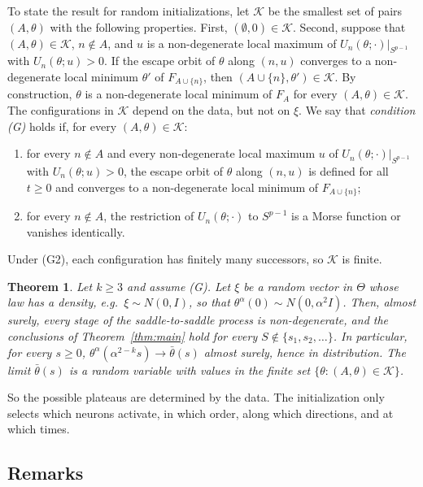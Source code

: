 \documentclass[11pt]{article}
\newtheorem{maintheorem}{Theorem}
\theoremstyle{definition}
\theoremstyle{remark}
\numberwithin{equation}{section}
\newcommand{\cK}{\mathcal{K}}
\begin{document}
To state the result for random initializations, let $\cK$ be the smallest set of pairs $(A,\theta)$ with the following properties. First, $(\emptyset,0)\in\cK$. Second, suppose that $(A,\theta)\in\cK$, $n\notin A$, and $u$ is a non-degenerate local maximum of $U_n(\theta;\cdot)|_{S^{p-1}}$ with $U_n(\theta;u)>0$. If the escape orbit of $\theta$ along $(n,u)$ converges to a non-degenerate local minimum $\theta'$ of $F_{A\cup\{n\}}$, then $(A\cup\{n\},\theta')\in\cK$. By construction, $\theta$ is a non-degenerate local minimum of $F_A$ for every $(A,\theta)\in\cK$. The configurations in $\cK$ depend on the data, but not on $\xi$. We say that \emph{condition \textup{(G)}} holds if, for every $(A,\theta)\in\cK$:
\begin{enumerate}[label=\textup{(G\arabic*)},leftmargin=4em]
\item for every $n\notin A$ and every non-degenerate local maximum $u$ of $U_n(\theta;\cdot)|_{S^{p-1}}$ with $U_n(\theta;u)>0$, the escape orbit of $\theta$ along $(n,u)$ is defined for all $t\ge0$ and converges to a non-degenerate local minimum of $F_{A\cup\{n\}}$;
\item for every $n\notin A$, the restriction of $U_n(\theta;\cdot)$ to $S^{p-1}$ is a Morse function or vanishes identically.
\end{enumerate}
Under (G2), each configuration has finitely many successors, so $\cK$ is finite.

\begin{maintheorem}\label{thm:gaussian}
Let $k\ge3$ and assume \textup{(G)}. Let $\xi$ be a random vector in $\Theta$ whose law has a density, e.g.\ $\xi\sim N(0,I)$, so that $\theta^\alpha(0)\sim N(0,\alpha^2I)$. Then, almost surely, every stage of the saddle-to-saddle process is non-degenerate, and the conclusions of Theorem~\ref{thm:main} hold for every $S\notin\{s_1,s_2,\dots\}$. In particular, for every $s\ge0$, $\theta^\alpha(\alpha^{2-k}s)\to\bar\theta(s)$ almost surely, hence in distribution. The limit $\bar\theta(s)$ is a random variable with values in the finite set $\{\theta:(A,\theta)\in\cK\}$.
\end{maintheorem}

So the possible plateaus are determined by the data. The initialization only selects which neurons activate, in which order, along which directions, and at which times.

\subsection{Remarks}
\end{document}
